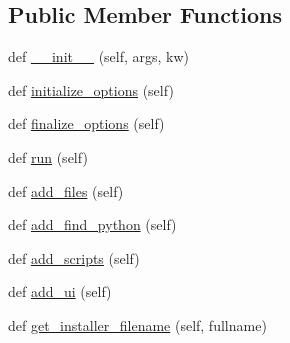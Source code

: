 \subsection*{Public Member Functions}
\begin{DoxyCompactItemize}
\item 
def \hyperlink{classsetuptools_1_1__distutils_1_1command_1_1bdist__msi_1_1bdist__msi_ab68db61bc6472fab8fcd3ba3415e1fef}{\+\_\+\+\_\+init\+\_\+\+\_\+} (self, args, kw)
\item 
def \hyperlink{classsetuptools_1_1__distutils_1_1command_1_1bdist__msi_1_1bdist__msi_a5df98f9c6f544e5f8713c85cfb6c4221}{initialize\+\_\+options} (self)
\item 
def \hyperlink{classsetuptools_1_1__distutils_1_1command_1_1bdist__msi_1_1bdist__msi_a8abbc1c1a7b9684fc6f83e4f83c3463f}{finalize\+\_\+options} (self)
\item 
def \hyperlink{classsetuptools_1_1__distutils_1_1command_1_1bdist__msi_1_1bdist__msi_aaf78383d7e076c7f940708682e1ded40}{run} (self)
\item 
def \hyperlink{classsetuptools_1_1__distutils_1_1command_1_1bdist__msi_1_1bdist__msi_a3efd6f383d7fef47d297e86392ace750}{add\+\_\+files} (self)
\item 
def \hyperlink{classsetuptools_1_1__distutils_1_1command_1_1bdist__msi_1_1bdist__msi_a9733f7e66f8a048a067e429a87e6c47e}{add\+\_\+find\+\_\+python} (self)
\item 
def \hyperlink{classsetuptools_1_1__distutils_1_1command_1_1bdist__msi_1_1bdist__msi_a21a8c869b6d2808c448c1ef9b8fe256a}{add\+\_\+scripts} (self)
\item 
def \hyperlink{classsetuptools_1_1__distutils_1_1command_1_1bdist__msi_1_1bdist__msi_a9f5e2dd5c867314a8d6d1c6e94047de8}{add\+\_\+ui} (self)
\item 
def \hyperlink{classsetuptools_1_1__distutils_1_1command_1_1bdist__msi_1_1bdist__msi_a0ecc5b515c7c96d3844dacc951aab083}{get\+\_\+installer\+\_\+filename} (self, fullname)
\end{DoxyCompactItemize}
